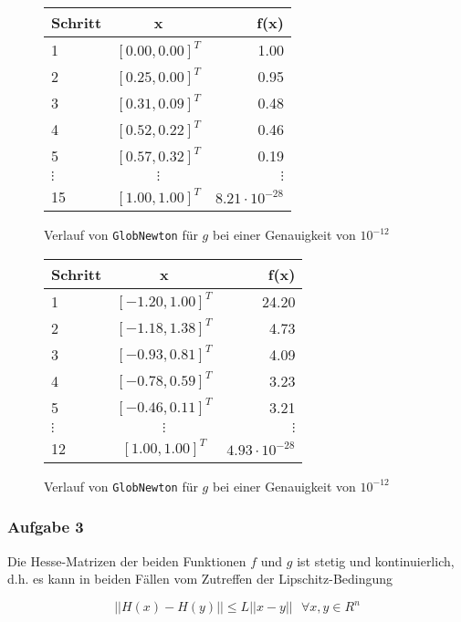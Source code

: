 \documentclass[a4paper, 12pt]{report}
\begin{document}
\begin{figure}[H]
  \centering
  \def\arraystretch{1.25}
  \begin{tabular}{l|c|r}
    \hline
    \textbf{Schritt} & \textbf{x} & \textbf{f(x)}\\
    \hline
    1 & $[0.00, 0.00]^T$ & 1.00\\
    2 & $[0.25, 0.00]^T$ & 0.95\\
    3 & $[0.31, 0.09]^T$ & 0.48\\
    4 & $[0.52, 0.22]^T$ & 0.46\\
    5 & $[0.57, 0.32]^T$ & 0.19\\
    $\vdots$ & $\vdots$ & $\vdots$\\
    15 & $[1.00, 1.00]^T$ & $8.21 \cdot 10^{-28}$\\
    \hline
  \end{tabular}
  \caption{Verlauf von \lstinline[basicstyle=\ttfamily\color{black}]|GlobNewton| für $g$ bei einer Genauigkeit von $10^{-12}$}
\end{figure}

\begin{figure}[H]
  \centering
  \def\arraystretch{1.25}
  \begin{tabular}{l|c|r}
    \hline
    \textbf{Schritt} & \textbf{x} & \textbf{f(x)}\\
    \hline
    1 & $[-1.20, 1.00]^T$ & 24.20\\
    2 & $[-1.18, 1.38]^T$ & 4.73\\
    3 & $[-0.93, 0.81]^T$ & 4.09\\
    4 & $[-0.78, 0.59]^T$ & 3.23\\
    5 & $[-0.46, 0.11]^T$ & 3.21\\
    $\vdots$ & $\vdots$ & $\vdots$\\
    12 & $[1.00, 1.00]^T$ & $4.93 \cdot 10^{-28}$\\
    \hline
  \end{tabular}
  \caption{Verlauf von \lstinline[basicstyle=\ttfamily\color{black}]|GlobNewton| für $g$ bei einer Genauigkeit von $10^{-12}$}
\end{figure}

\subsubsection{Aufgabe 3}
Die Hesse-Matrizen der beiden Funktionen $f$ und $g$ ist stetig und kontinuierlich, d.h. es kann in beiden Fällen vom
Zutreffen der Lipschitz-Bedingung

$$ ||H(x) - H(y)|| \leq L||x-y|| \text{  } \forall x,y \in R^n$$
\end{document}
